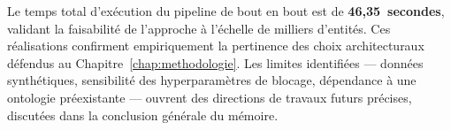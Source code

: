 Le temps total d'exécution du pipeline de bout en bout est de
\textbf{46,35~secondes}, validant la faisabilité de l'approche à
l'échelle de milliers d'entités. Ces réalisations confirment empiriquement
la pertinence des choix architecturaux défendus au
Chapitre~\ref{chap:methodologie}. Les limites identifiées --- données
synthétiques, sensibilité des hyperparamètres de blocage, dépendance
à une ontologie préexistante --- ouvrent des directions de travaux
futurs précises, discutées dans la conclusion générale du mémoire.